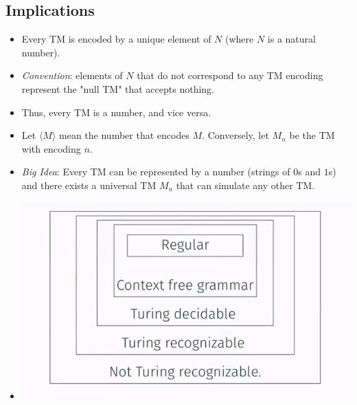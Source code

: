 \documentclass[12pt]{article}
\begin{document}
\subsection{Implications}
\begin{itemize}
    \item Every TM is encoded by a unique element of $N$ (where $N$ is a natural number).
    \item \textit{Convention}: elements of $N$ that do not correspond to any TM encoding represent the "null TM" that accepts nothing.
    \item Thus, every TM is a number, and vice versa.
    \item Let $\langle M \rangle$ mean the number that encodes $M$. Conversely, let $M_n$ be the TM with encoding $n$.
    \item \textit{Big Idea}: Every TM can be represented by a number (strings of $0$s and $1$s) and there exists a universal TM $M_u$ that can simulate any other TM.
    \item[] \includegraphics[width=\textwidth]{images/turing-recognizable.png}
\end{itemize}
\end{document}
